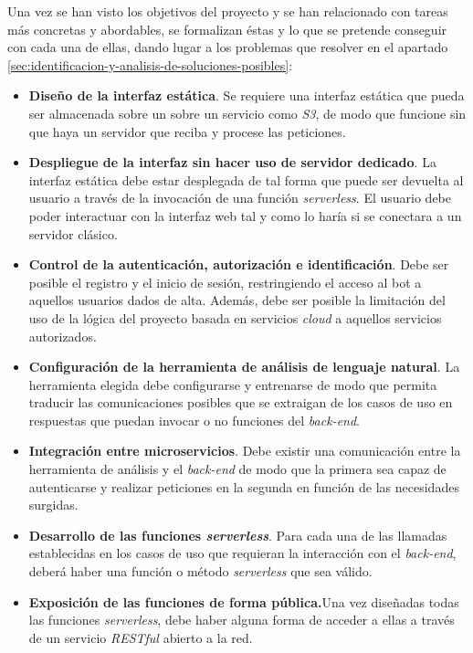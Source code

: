 \documentclass[11pt,spanish,listoffigures]{tfgetsinf}
\begin{document}
Una vez se han visto los objetivos del proyecto y se han relacionado con tareas más concretas y abordables, se formalizan éstas y lo que se pretende conseguir con cada una de ellas, dando lugar a los problemas que resolver en el apartado \ref{sec:identificacion-y-analisis-de-soluciones-posibles}:

\begin{itemize}
\item \textbf{Diseño de la interfaz estática}. Se requiere una interfaz estática que pueda ser almacenada sobre un sobre un servicio como \textit{S3}, de modo que funcione sin que haya un servidor que reciba y procese las peticiones.

\item \textbf{Despliegue de la interfaz sin hacer uso de servidor dedicado}. La interfaz estática debe estar desplegada de tal forma que puede ser devuelta al usuario a través de la invocación de una función \textit{serverless}. El usuario debe poder interactuar con la interfaz web tal y como lo haría si se conectara a un servidor clásico.

\item \textbf{Control de la autenticación, autorización e identificación}. Debe ser posible el registro y el inicio de sesión, restringiendo el acceso al bot a aquellos usuarios dados de alta. Además, debe ser posible la limitación del uso de la lógica del proyecto basada en servicios \textit{cloud} a aquellos servicios autorizados.

\item \textbf{Configuración de la herramienta de análisis de lenguaje natural}. La herramienta elegida debe configurarse y entrenarse de modo que permita traducir las comunicaciones posibles que se extraigan de los casos de uso en respuestas que puedan invocar o no funciones del \textit{back-end}.

\item \textbf{Integración entre microservicios}. Debe existir una comunicación entre la herramienta de análisis y el \textit{back-end} de modo que la primera sea capaz de autenticarse y realizar peticiones en la segunda en función de las necesidades surgidas.

\item \textbf{Desarrollo de las funciones \textit{serverless}}. Para cada una de las llamadas establecidas en los casos de uso que requieran la interacción con el \textit{back-end}, deberá haber una función o método \textit{serverless} que sea válido.

\item \textbf{Exposición de las funciones de forma pública.}Una vez diseñadas todas las funciones \textit{serverless}, debe haber alguna forma de acceder a ellas a través de un servicio \textit{RESTful} abierto a la red.

\end{itemize}
\end{document}
